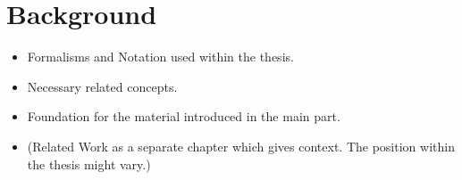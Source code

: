 \chapter{Background}\label{cha:bg}

\begin{itemize}
  \item Formalisms and Notation used within the thesis.
  \item Necessary related concepts.
  \item Foundation for the material introduced in the main part.
  \item (Related Work as a separate chapter which gives context. The position within the thesis might vary.) 
\end{itemize}


